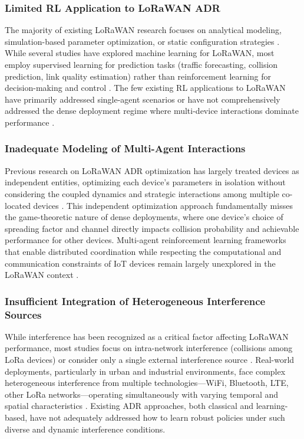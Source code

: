 \documentclass[12pt,a4paper]{article}
\begin{document}
\subsubsection{Limited RL Application to LoRaWAN ADR}

The majority of existing LoRaWAN research focuses on analytical modeling, simulation-based parameter optimization, or static configuration strategies \cite{reynders2017improving, cuomo2017explora}. While several studies have explored machine learning for LoRaWAN, most employ supervised learning for prediction tasks (traffic forecasting, collision prediction, link quality estimation) rather than reinforcement learning for decision-making and control \cite{abdelfadeel2020machine, rizzi2017evaluation}. The few existing RL applications to LoRaWAN have primarily addressed single-agent scenarios or have not comprehensively addressed the dense deployment regime where multi-device interactions dominate performance \cite{hu2020machine}.

\subsubsection{Inadequate Modeling of Multi-Agent Interactions}

Previous research on LoRaWAN ADR optimization has largely treated devices as independent entities, optimizing each device's parameters in isolation without considering the coupled dynamics and strategic interactions among multiple co-located devices \cite{slabicki2018adaptive}. This independent optimization approach fundamentally misses the game-theoretic nature of dense deployments, where one device's choice of spreading factor and channel directly impacts collision probability and achievable performance for other devices. Multi-agent reinforcement learning frameworks that enable distributed coordination while respecting the computational and communication constraints of IoT devices remain largely unexplored in the LoRaWAN context \cite{busoniu2008comprehensive}.

\subsubsection{Insufficient Integration of Heterogeneous Interference Sources}

While interference has been recognized as a critical factor affecting LoRaWAN performance, most studies focus on intra-network interference (collisions among LoRa devices) or consider only a single external interference source \cite{croce2018impact}. Real-world deployments, particularly in urban and industrial environments, face complex heterogeneous interference from multiple technologies—WiFi, Bluetooth, LTE, other LoRa networks—operating simultaneously with varying temporal and spatial characteristics \cite{hosseinzadeh2020empirical}. Existing ADR approaches, both classical and learning-based, have not adequately addressed how to learn robust policies under such diverse and dynamic interference conditions.
\end{document}
